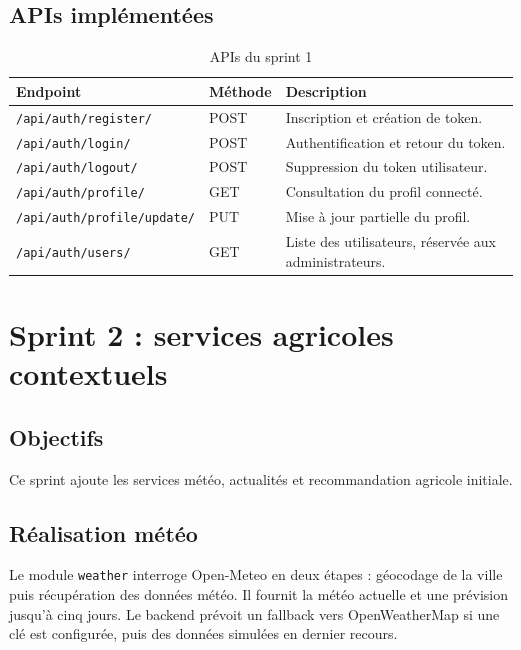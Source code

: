 




\subsection{APIs implémentées}
\begin{longtable}{p{4.5cm}p{2cm}p{7cm}}
\caption{APIs du sprint 1}\\
\toprule
\textbf{Endpoint} & \textbf{Méthode} & \textbf{Description} \\
\midrule
\texttt{/api/auth/register/} & POST & Inscription et création de token. \\
\texttt{/api/auth/login/} & POST & Authentification et retour du token. \\
\texttt{/api/auth/logout/} & POST & Suppression du token utilisateur. \\
\texttt{/api/auth/profile/} & GET & Consultation du profil connecté. \\
\texttt{/api/auth/profile/update/} & PUT & Mise à jour partielle du profil. \\
\texttt{/api/auth/users/} & GET & Liste des utilisateurs, réservée aux administrateurs. \\
\bottomrule
\end{longtable}

\section{Sprint 2 : services agricoles contextuels}
\subsection{Objectifs}
Ce sprint ajoute les services météo, actualités et recommandation agricole initiale.

\subsection{Réalisation météo}
Le module \texttt{weather} interroge Open-Meteo en deux étapes : géocodage de la ville puis récupération des données météo. Il fournit la météo actuelle et une prévision jusqu'à cinq jours. Le backend prévoit un fallback vers OpenWeatherMap si une clé est configurée, puis des données simulées en dernier recours.

